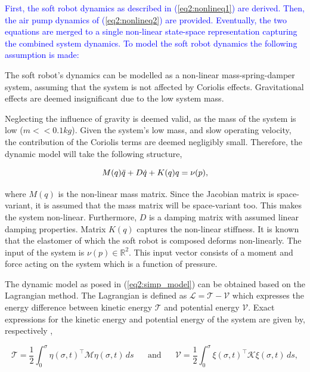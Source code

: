 \textcolor{blue}{First, the soft robot dynamics as described in (\ref{eq2:nonlineq1}) are derived. Then, the air pump dynamics of (\ref{eq2:nonlineq2}) are provided. Eventually, the two equations are merged to a single non-linear state-space representation capturing the combined system dynamics. To model the soft robot dynamics the following assumption is made:}

\begin{theorem}
The soft robot's dynamics can be modelled as a non-linear mass-spring-damper system, assuming that the system is not affected by Coriolis effects. Gravitational effects are deemed insignificant due to the low system mass.
\end{theorem}

Neglecting the influence of gravity is deemed valid, as the mass of the system is low ($m << 0.1 kg$). Given the system's low mass, and slow operating velocity, the contribution of the Coriolis terms are deemed negligibly small. Therefore, the dynamic model will take the following structure,


\begin{equation}
    M(q)\Ddot{q} + D\dot{q} + K(q)q = \nu(p),
    \label{eq2:simp_model}
\end{equation}


where $M(q)$ is the non-linear mass matrix. Since the Jacobian matrix is space-variant, it is assumed that the mass matrix will be space-variant too. This makes the system non-linear. Furthermore, $D$ is a damping matrix with assumed linear damping properties. Matrix $K(q)$ captures the non-linear stiffness. It is known that the elastomer of which the soft robot is composed deforms non-linearly. The input of the system is $\nu(p) \in \mathbb{R}^2$. This input vector consists of a moment and force acting on the system which is a function of pressure. 

The dynamic model as posed in (\ref{eq2:simp_model}) can be obtained based on the Lagrangian method. The Lagrangian is defined as $\mathcal{L} = \mathcal{T} -\mathcal{V}$ which expresses the energy difference between kinetic energy $\mathcal{T}$ and potential energy $\mathcal{V}$. Exact expressions for the kinetic energy and potential energy of the system are given by, respectively  \textcolor{blue}{\cite{Caasenbrood2020}},

\begin{equation}
    \mathcal{T} = \frac{1}{2}\int_0^{\sigma} \eta(\sigma,t)^\top \mathcal{M} \eta(\sigma,t) \hspace{2pt} ds \hspace{20pt} \text{and} \hspace{20pt}  \mathcal{V} = \frac{1}{2}\int_0^{\sigma} \xi(\sigma,t)^\top \mathcal{K} \xi(\sigma,t)  \hspace{2pt} ds,
    \label{eq2:T}
\end{equation}


